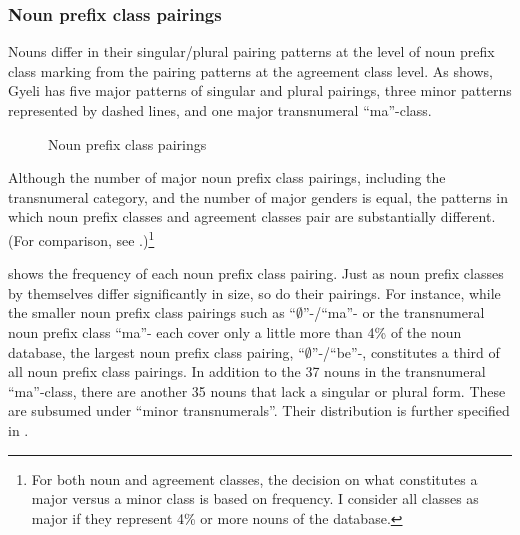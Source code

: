 \subsubsection{Noun prefix class pairings}

Nouns differ in their singular/plural pairing patterns at the level of noun prefix class marking from the pairing patterns at the agreement class level. As  shows, Gyeli has five major patterns of singular and plural pairings, three minor patterns represented by dashed lines, and one major transnumeral ``ma''-class.


\begin{figure}

\caption{Noun prefix class pairings}
\label{Fig:NCs}
\end{figure}

\noindent Although the number of major noun prefix class pairings, including the transnumeral category, and the number of major genders is equal, the patterns in which noun prefix classes and agreement classes pair are substantially different. (For comparison, see .)\footnote{For both noun and agreement classes, the decision on what constitutes a major versus a minor class is based on frequency. I consider all classes as major if they represent 4\% or more nouns of the database.}

 shows the frequency of each noun prefix class pairing. Just as noun prefix classes by themselves differ significantly in size, so do their pairings. For instance, while the smaller noun prefix class pairings such as ``$\emptyset$''-/``ma''- or the transnumeral noun prefix class ``ma''- each cover only a little more than 4\%  of the noun database, the largest noun prefix class pairing, ``$\emptyset$''-/``be''-, constitutes a third of all noun prefix class pairings.
In addition to the 37 nouns in the transnumeral ``ma''-class, there are another 35 nouns that lack a singular or plural form. These are subsumed under ``minor transnumerals''. Their distribution is further specified in .
  \clearpage


